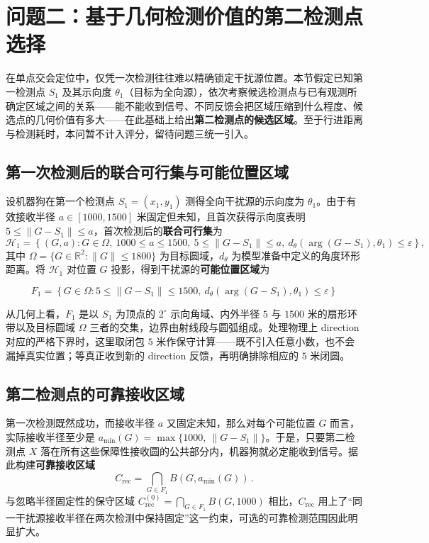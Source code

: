 \documentclass[withoutpreface]{cumcmthesis}
\begin{document}
\section{问题二：基于几何检测价值的第二检测点选择}

在单点交会定位中，仅凭一次检测往往难以精确锁定干扰源位置。本节假定已知第一检测点 $S_1$ 及其示向度 $\theta_1$（目标为全向源），依次考察候选检测点与已有观测所确定区域之间的关系——能不能收到信号、不同反馈会把区域压缩到什么程度、候选点的几何价值有多大——在此基础上给出\textbf{第二检测点的候选区域}。至于行进距离与检测耗时，本问暂不计入评分，留待问题三统一引入。

\subsection{第一次检测后的联合可行集与可能位置区域}

设机器狗在第一个检测点 $S_1=(x_1,y_1)$ 测得全向干扰源的示向度为 $\theta_1$。由于有效接收半径 $a \in [1000, 1500]$ 米固定但未知，且首次获得示向度表明 $5 \le \|G - S_1\| \le a$，首次检测后的\textbf{联合可行集}为
\begin{equation}\label{eq:joint_feasible_H1}
\mathcal H_1 = \left\{ (G,a) : G \in \Omega,\ 1000 \le a \le 1500,\ 5 \le \|G - S_1\| \le a,\ d_\theta(\operatorname{arg}(G - S_1), \theta_1) \le \varepsilon \right\},
\end{equation}
其中 $\Omega = \{G \in \mathbb R^2 : \|G\| \le 1800\}$ 为目标圆域，$d_\theta$ 为模型准备中定义的角度环形距离。将 $\mathcal H_1$ 对位置 $G$ 投影，得到干扰源的\textbf{可能位置区域}为

\begin{equation}\label{eq:F1_projection}
F_1 = \left\{ G \in \Omega : 5 \le \|G - S_1\| \le 1500,\ d_\theta(\operatorname{arg}(G - S_1), \theta_1) \le \varepsilon \right\}
\end{equation}

从几何上看，$F_1$ 是以 $S_1$ 为顶点的 $2^\circ$ 示向角域、内外半径 $5$ 与 $1500$ 米的扇形环带以及目标圆域 $\Omega$ 三者的交集，边界由射线段与圆弧组成。处理物理上 direction 对应的严格下界时，这里取闭包 $5$ 米作保守计算——既不引入任意小数，也不会漏掉真实位置；等真正收到新的 direction 反馈，再明确排除相应的 $5$ 米闭圆。

\subsection{第二检测点的可靠接收区域}

第一次检测既然成功，而接收半径 $a$ 又固定未知，那么对每个可能位置 $G$ 而言，实际接收半径至少是 $a_{\min}(G) = \max\{1000,\ \|G - S_1\|\}$。于是，只要第二检测点 $X$ 落在所有这些保障性接收圆的公共部分内，机器狗就必定能收到信号。据此构建\textbf{可靠接收区域}
\begin{equation}\label{eq:C_rec}
\boxed{
C_{\mathrm{rec}} = \bigcap_{G \in F_1} B\left(G, a_{\min}(G)\right)
}\,.
\end{equation}
与忽略半径固定性的保守区域 $C_{\mathrm{rec}}^{(0)} = \bigcap_{G \in F_1} B(G, 1000)$ 相比，$C_{\mathrm{rec}}$ 用上了“同一干扰源接收半径在两次检测中保持固定”这一约束，可选的可靠检测范围因此明显扩大。
\end{document}
